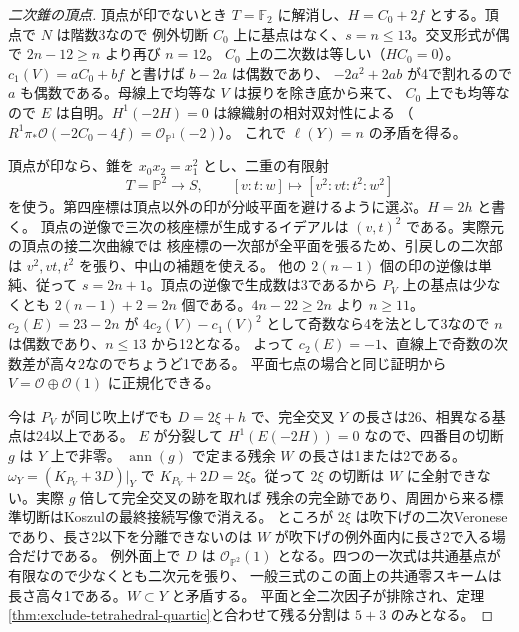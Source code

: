 \begin{proof}[二次錐の頂点]
頂点が印でないとき $T=\mathbb F_2$ に解消し、$H=C_0+2f$ とする。頂点で $N$ は階数3なので
例外切断 $C_0$ 上に基点はなく、$s=n\le13$。交叉形式が偶で $2n-12\ge n$ より再び $n=12$。
$C_0$ 上の二次数は等しい（$HC_0=0$）。$c_1(V)=a C_0+b f$ と書けば $b-2a$ は偶数であり、
$-2a^2+2ab$ が4で割れるので $a$ も偶数である。母線上で均等な $V$ は捩りを除き底から来て、
$C_0$ 上でも均等なので $E$ は自明。$H^1(-2H)=0$ は線織射の相対双対性による
（$R^1\pi_*\mathcal O(-2C_0-4f)=\mathcal O_{\mathbb P^1}(-2)$）。
これで $\ell(Y)=n$ の矛盾を得る。

頂点が印なら、錐を $x_0x_2=x_1^2$ とし、二重の有限射
\[
           T=\mathbb P^2\longrightarrow S,\qquad
             [v:t:w]\longmapsto[v^2:vt:t^2:w^2]
\]
を使う。第四座標は頂点以外の印が分岐平面を避けるように選ぶ。$H=2h$ と書く。
頂点の逆像で三次の核座標が生成するイデアルは $(v,t)^2$ である。実際元の頂点の接二次曲線では
核座標の一次部が全平面を張るため、引戻しの二次部は $v^2,vt,t^2$ を張り、中山の補題を使える。
他の $2(n-1)$ 個の印の逆像は単純、従って $s=2n+1$。頂点の逆像で生成数は3であるから
$P_V$ 上の基点は少なくとも $2(n-1)+2=2n$ 個である。$4n-22\ge2n$ より $n\ge11$。
$c_2(E)=23-2n$ が $4c_2(V)-c_1(V)^2$ として奇数なら4を法として3なので $n$ は偶数であり、$n\le13$ から12となる。
よって $c_2(E)=-1$、直線上で奇数の次数差が高々2なのでちょうど1である。
平面七点の場合と同じ証明から $V=\mathcal O\oplus\mathcal O(1)$ に正規化できる。

今は $P_V$ が同じ吹上げでも $D=2\xi+h$ で、完全交叉 $Y$ の長さは26、相異なる基点は24以上である。
$E$ が分裂して $H^1(E(-2H))=0$ なので、四番目の切断 $g$ は $Y$ 上で非零。
$\operatorname{ann}(g)$ で定まる残余 $W$ の長さは1または2である。$\omega_Y=(K_{P_V}+3D)|_Y$ で
$K_{P_V}+2D=2\xi$。従って $2\xi$ の切断は $W$ に全射できない。実際 $g$ 倍して完全交叉の跡を取れば
残余の完全跡であり、周囲から来る標準切断はKoszulの最終接続写像で消える。
ところが $2\xi$ は吹下げの二次Veroneseであり、長さ2以下を分離できないのは
$W$ が吹下げの例外面内に長さ2で入る場合だけである。
例外面上で $D$ は $\mathcal O_{\mathbb P^2}(1)$ となる。四つの一次式は共通基点が有限なので少なくとも二次元を張り、
一般三式のこの面上の共通零スキームは長さ高々1である。$W\subset Y$ と矛盾する。
平面と全二次因子が排除され、定理\ref{thm:exclude-tetrahedral-quartic}と合わせて残る分割は $5+3$ のみとなる。
\end{proof}
